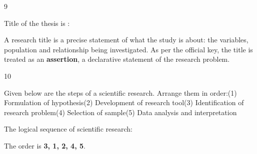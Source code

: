\begin{question}{9}
{Title of the thesis is :\par}
\begin{explain}
A research title is a precise statement of what the study is about: the variables, population and relationship being investigated. As per the official key, the title is treated as an \textbf{assertion}, a declarative statement of the research problem.
\end{explain}
\end{question}

\begin{question}{10}
{Given below are the steps of a scientific research. Arrange them in order:\newline (1) Formulation of hypothesis\newline (2) Development of research tool\newline (3) Identification of research problem\newline (4) Selection of sample\newline (5) Data analysis and interpretation\par}
\begin{explain}
The logical sequence of scientific research:
\begin{center}
\end{center}
The order is \textbf{3, 1, 2, 4, 5}.
\end{explain}
\end{question}

